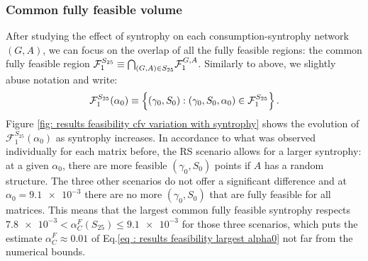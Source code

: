 \documentclass[12pt, titlepage]{report}
\begin{document}
  \subsubsection{Common fully feasible volume}
 After studying the effect of syntrophy on each consumption-syntrophy network $(G,A)$, we can focus on the overlap of all the fully feasible regions: the common fully feasible region $\mathcal{F}_1^{S_{25}}\equiv {\bigcap}_{(G,A)\in S_{25}} \mathcal{F}^{G,A}_1$. Similarly to above, we slightly abuse notation and write:
\begin{equation}
\mathcal{F}_1^{S_{25}}(\alpha_0) \equiv \left\{(\gamma_0, S_0) : (\gamma_0, S_0, \alpha_0) \in \mathcal{F}_1^{S_{25}}\right\}.
\end{equation}
 Figure \ref{fig: results feasibility cfv variation with syntrophy} shows the evolution of $\mathcal{F}_1^{S_{25}}(\alpha_0)$ as syntrophy increases. %
 In accordance to what was observed individually for each matrix before, the RS scenario allows for a larger syntrophy: at a given $\alpha_0$, there are more feasible $(\gamma_0, S_0)$ points if $A$ has a random structure. The three other scenarios do not offer a significant difference and at $\alpha_0=\num{9.1e-3}$ there are no more $(\gamma_0, S_0)$ that are fully feasible for all matrices. This means that the largest common fully feasible syntrophy respects $\num{7.8e-3}<\alpha_C^F(S_{25}) \leq \num{9.1e-3}$ for those three scenarios, which puts the estimate $\alpha_C^F \approx 0.01$ of Eq.\eqref{eq : results feasibility largest alpha0} not far from the numerical bounds.
\end{document}
